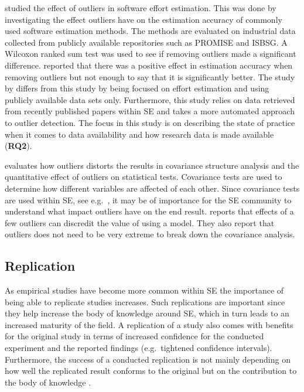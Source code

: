 \citet{seo2013value} studied the effect of outliers in software effort estimation. This was done by investigating the effect outliers have on the estimation accuracy of commonly used software estimation methods. The methods are evaluated on industrial data collected from publicly available repositories such as PROMISE and ISBSG\@. A Wilcoxon ranked sum test was used to see if removing outliers made a significant difference. \citet{seo2013value} reported that there was a positive effect in estimation accuracy when removing outliers but not enough to say that it is significantly better. The study by \citet{seo2013value} differs from this study by being focused on effort estimation and using publicly available data sets only. Furthermore, this study relies on data retrieved from recently published papers within SE and takes a more automated approach to outlier detection. The focus in this study is on describing the state of practice when it comes to data availability and how research data is made available (\textbf{RQ2}).




\citet{yuan2001effect} evaluates how outliers distorts the results in covariance structure analysis and the quantitative effect of outliers on statistical tests. Covariance tests are used to determine how different variables are affected of each other. Since covariance tests are used within SE, see e.g.\ \citet{card1987evaluating}, it may be of importance for the SE community to understand what impact outliers have on the end result. \citet{yuan2001effect} reports that effects of a few outliers can discredit the value of using a model. They also report that outliers does not need to be very extreme to break down the covariance analysis.




\subsection{Replication}
\label{sec:related-replication}
As empirical studies have become more common within SE the importance of being able to replicate studies increases. Such replications are important since they help increase the body of knowledge around SE, which in turn leads to an increased maturity of the field. A replication of a study also comes with benefits for the original study in terms of increased confidence for the conducted experiment and the reported findings (e.g.\ tightened confidence intervals). Furthermore, the success of a conducted replication is not mainly depending on how well the replicated result conforms to the original but on the contribution to the body of knowledge \citep{basili1999building, shull2008role, brooks2008replication}.




